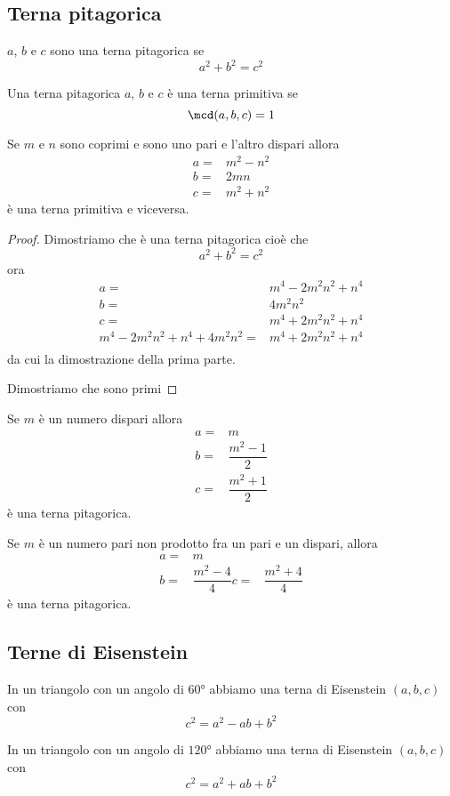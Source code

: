 \subsection{Terna pitagorica}
\begin{defn}
$a$, $b$ e $c$ sono una terna pitagorica se \[a^2+b^2=c^2\]
\end{defn}
\begin{defn}
Una terna pitagorica  $a$, $b$ e $c$ è una terna primitiva se
\[\mcd(a,b,c)=1\]
\end{defn}
\begin{thm}
	Se $m$ e $n$ sono coprimi e sono uno pari e l'altro dispari allora
	\begin{align*}
	a=&m^2-n^2\\
	b=&2mn\\
	c=&m^2+n^2
	\end{align*}
	è una terna primitiva e viceversa. 
\end{thm}
\begin{proof}
	Dimostriamo che è una terna pitagorica cioè che \[a^2+b^2=c^2\]
	ora 
		\begin{align*}
	a=&m^4-2m^2n^2+n^4\\
	b=&4m^2n^2\\
	c=&m^4+2m^2n^2+n^4\\
	m^4-2m^2n^2+n^4+4m^2n^2=&m^4+2m^2n^2+n^4\\
	\end{align*}
	da cui la dimostrazione della prima parte. 
	
	Dimostriamo che sono primi
\end{proof}
\begin{thm}
	Se $m$ è un numero dispari allora
		\begin{align*}
	a=&m\\
	b=&\dfrac{m^2-1}{2} \\
	c=&\dfrac{m^2+1}{2}
	\end{align*}
	è una terna pitagorica.\par
		Se $m$ è un numero pari non prodotto fra un pari e un dispari, allora
	\begin{align*}
	a=&m\\
	b=&\dfrac{m^2-4}{4} 
	c=&\dfrac{m^2+4}{4}
	\end{align*}
		è una terna pitagorica.
\end{thm}
\subsection{Terne di Eisenstein}
In un triangolo con un angolo  di $\ang{60}$
abbiamo una terna di Eisenstein $(a,b,c)$ con
\begin{equation*}
	c^2=a^2-ab+b^2
\end{equation*}

In un triangolo con un angolo  di $\ang{120}$
abbiamo una terna di Eisenstein $(a,b,c)$ con
\begin{equation*}
	c^2=a^2+ab+b^2
\end{equation*}
